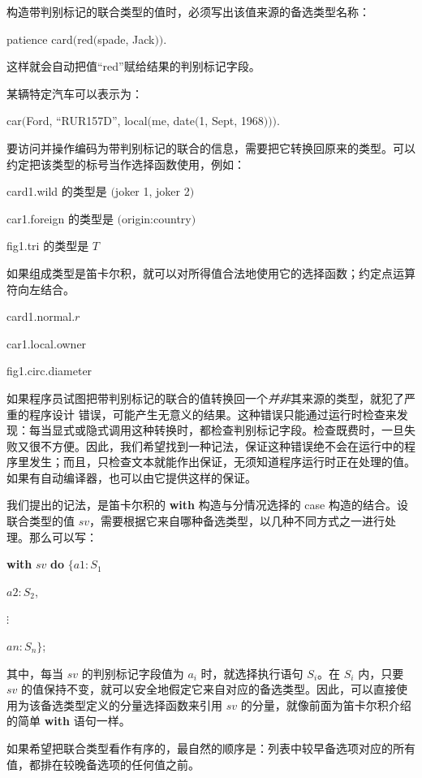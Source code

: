 \documentclass[twoside,11pt,fontset=none]{ctexbook}
\let\mathvdots\vdots
\renewcommand{\vdots}{\ensuremath{\mathvdots}}%
\begin{document}
构造带判别标记的联合类型的值时，必须写出该值来源的备选类型名称：
\smallskip

\quad patience card$($red$($spade, Jack$))$.
\smallskip

\noindent
这样就会自动把值“red”赋给结果的判别标记字段。

某辆特定汽车可以表示为：
\smallskip

\quad car$($Ford, ``RUR157D'', local$($me, date$($1, Sept, 1968$)))$.
\smallskip

要访问并操作编码为带判别标记的联合的信息，需要把它转换回原来的类型。可以约定把该类型的标号当作选择函数使用，例如：

card1.wild \tabto*{8em} 的类型是 $($joker 1, joker 2$)$

car1.foreign \tabto*{8em} 的类型是 $($origin:country$)$

fig1.tri \tabto*{8em} 的类型是 $T$

\noindent
如果组成类型是笛卡尔积，就可以对所得值合法地使用它的选择函数；约定点运算符向左结合。

\quad card1.normal.$r$

\quad car1.local.owner

\quad fig1.circ.diameter

如果程序员试图把带判别标记的联合的值转换回一个\textit{并非}其来源的类型，就犯了严重的程序设计
错误，可能产生无意义的结果。这种错误只能通过运行时检查来发现：每当显式或隐式调用这种转换时，都检查判别标记字段。检查既费时，一旦失败又很不方便。因此，我们希望找到一种记法，保证这种错误绝不会在运行中的程序里发生；而且，只检查文本就能作出保证，无须知道程序运行时正在处理的值。如果有自动编译器，也可以由它提供这样的保证。

我们提出的记法，是笛卡尔积的 \textbf{with} 构造与分情况选择的 case 构造的结合。设联合类型的值 $sv$，需要根据它来自哪种备选类型，以几种不同方式之一进行处理。那么可以写：

\quad \textbf{with} $sv$ \textbf{do} $\{a1:S_1$

\tabto*{7.6em}$a2:S_2$,
\smallskip

\tabto*{8.85em}\vdots

\tabto*{7.6em}$an:S_n\}$;

\noindent
其中，每当 $sv$ 的判别标记字段值为 $a_i$ 时，就选择执行语句 $S_i$。在 $S_i$ 内，只要 $sv$ 的值保持不变，就可以安全地假定它来自对应的备选类型。因此，可以直接使用为该备选类型定义的分量选择函数来引用 $sv$ 的分量，就像前面为笛卡尔积介绍的简单 \textbf{with} 语句一样。

如果希望把联合类型看作有序的，最自然的顺序是：列表中较早备选项对应的所有值，都排在较晚备选项的任何值之前。
\end{document}
